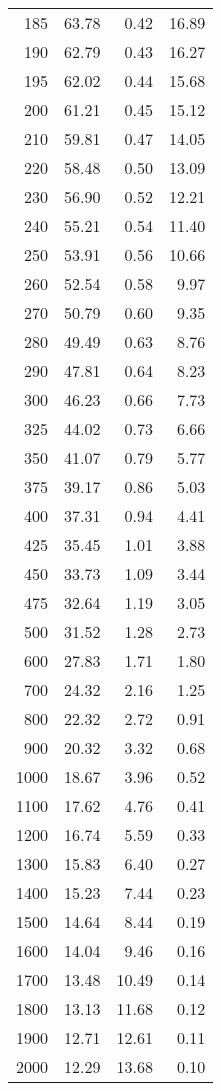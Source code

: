 \begin{table}[ht]
\begin{tabular}{rrrr}
   185 & 63.78 & 0.42 & 16.89 \\ 
   190 & 62.79 & 0.43 & 16.27 \\ 
   195 & 62.02 & 0.44 & 15.68 \\ 
   200 & 61.21 & 0.45 & 15.12 \\ 
   210 & 59.81 & 0.47 & 14.05 \\ 
   220 & 58.48 & 0.50 & 13.09 \\ 
   230 & 56.90 & 0.52 & 12.21 \\ 
   240 & 55.21 & 0.54 & 11.40 \\ 
   250 & 53.91 & 0.56 & 10.66 \\ 
   260 & 52.54 & 0.58 & 9.97 \\ 
   270 & 50.79 & 0.60 & 9.35 \\ 
   280 & 49.49 & 0.63 & 8.76 \\ 
   290 & 47.81 & 0.64 & 8.23 \\ 
   300 & 46.23 & 0.66 & 7.73 \\ 
   325 & 44.02 & 0.73 & 6.66 \\ 
   350 & 41.07 & 0.79 & 5.77 \\ 
   375 & 39.17 & 0.86 & 5.03 \\ 
   400 & 37.31 & 0.94 & 4.41 \\ 
   425 & 35.45 & 1.01 & 3.88 \\ 
   450 & 33.73 & 1.09 & 3.44 \\ 
   475 & 32.64 & 1.19 & 3.05 \\ 
   500 & 31.52 & 1.28 & 2.73 \\ 
   600 & 27.83 & 1.71 & 1.80 \\ 
   700 & 24.32 & 2.16 & 1.25 \\ 
   800 & 22.32 & 2.72 & 0.91 \\ 
   900 & 20.32 & 3.32 & 0.68 \\ 
  1000 & 18.67 & 3.96 & 0.52 \\ 
  1100 & 17.62 & 4.76 & 0.41 \\ 
  1200 & 16.74 & 5.59 & 0.33 \\ 
  1300 & 15.83 & 6.40 & 0.27 \\ 
  1400 & 15.23 & 7.44 & 0.23 \\ 
  1500 & 14.64 & 8.44 & 0.19 \\ 
  1600 & 14.04 & 9.46 & 0.16 \\ 
  1700 & 13.48 & 10.49 & 0.14 \\ 
  1800 & 13.13 & 11.68 & 0.12 \\ 
  1900 & 12.71 & 12.61 & 0.11 \\ 
  2000 & 12.29 & 13.68 & 0.10 \\ 
   \hline
\end{tabular}
\end{table}
